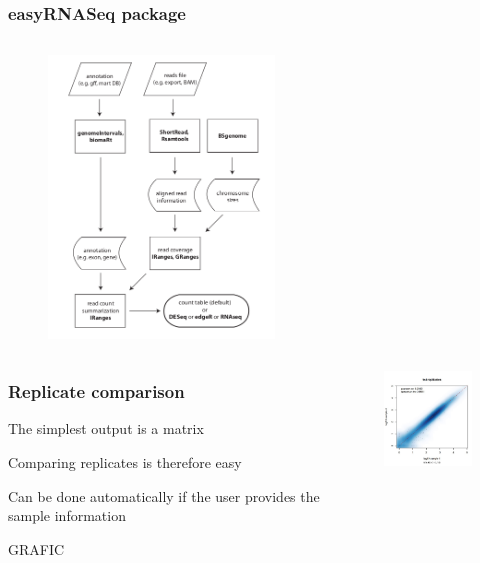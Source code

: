 \documentclass{beamer}
\begin{document}
\begin{frame}
\frametitle{easyRNASeq package}
\begin{column}{0.8\textwidth}
      \begin{figure}[ht]
      \centering
      \includegraphics[width=60mm]{diagramas/Seleccio_013.png}
      \end{figure}
  \end{column}
\end{frame}


\begin{frame}
\begin{columns}
\begin{column}{0.6\textwidth}
\frametitle{Replicate comparison}
  \bit
      \item The simplest output is a matrix
        \bit
            \item Comparing replicates is therefore easy
            \item Can be done automatically if the user provides the sample information
            \item GRAFIC
        \eit
  \eit
  \end{column}
\begin{column}{0.6\textwidth}
      \begin{figure}[ht]
      \centering
      \includegraphics[width=40mm]{diagramas/Seleccio_014.png}
      \end{figure}
\end{column}
\end{columns}
\end{frame}
\end{document}
